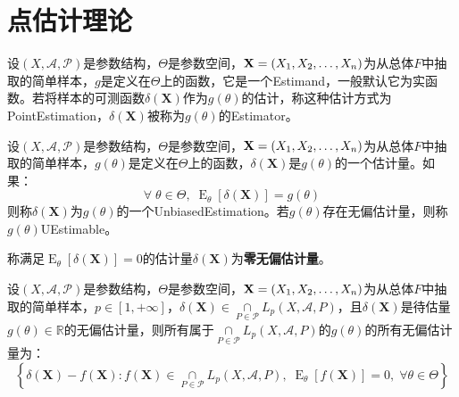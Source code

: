 \chapter{点估计理论}

\begin{definition}
	设$(X,\mathscr{A},\mathscr{P})$是参数结构，$\Theta$是参数空间，$\mathbf{X}=(X_1, X_2, \dots, X_{n})$为从总体$F$中抽取的简单样本，$g$是定义在$\Theta$上的函数，它是一个\gls{Estimand}，一般默认它为实函数。若将样本的可测函数$\delta(\mathbf{X})$作为$g(\theta)$的估计，称这种估计方式为\gls{PointEstimation}，$\delta(\mathbf{X})$被称为$g(\theta)$的\gls{Estimator}。
\end{definition}
\begin{definition}
	设$(X,\mathscr{A},\mathscr{P})$是参数结构，$\Theta$是参数空间，$\mathbf{X}=(X_1, X_2, \dots, X_{n})$为从总体$F$中抽取的简单样本，$g(\theta)$是定义在$\Theta$上的函数，$\delta(\mathbf{X})$是$g(\theta)$的一个估计量。如果：
	\begin{equation*}
		\forall\;\theta\in\Theta,\;\operatorname{E}_{\theta}[\delta(\mathbf{X})]=g(\theta)
	\end{equation*}
	则称$\delta(\mathbf{X})$为$g(\theta)$的一个\gls{UnbiasedEstimation}。若$g(\theta)$存在无偏估计量，则称$g(\theta)$\gls{UEstimable}。
\end{definition}
\begin{definition}
	称满足$\operatorname{E}_{\theta}[\delta(\mathbf{X})]=0$的估计量$\delta(\mathbf{X})$为\textbf{零无偏估计量}。
\end{definition}
\begin{property}\label{prop:UnbiasedEstimator}
	设$(X,\mathscr{A},\mathscr{P})$是参数结构，$\Theta$是参数空间，$\mathbf{X}=(X_1, X_2, \dots, X_{n})$为从总体$F$中抽取的简单样本，$p\in[1,+\infty]$，$\delta(\mathbf{X})\in\underset{P\in\mathscr{P}}{\cap}L_p(X,\mathscr{A},P)$，且$\delta(\mathbf{X})$是待估量$g(\theta)\in\mathbb{R}$的无偏估计量，则所有属于$\underset{P\in\mathscr{P}}{\cap}L_p(X,\mathscr{A},P)$的$g(\theta)$的所有无偏估计量为：
	\begin{equation*}
		\left\{\delta(\mathbf{X})-f(\mathbf{X}):f(\mathbf{X})\in\underset{P\in\mathscr{P}}{\cap}L_p(X,\mathscr{A},P),\;\operatorname{E}_\theta[f(\mathbf{X})]=0,\;\forall\theta\in\Theta\right\}
	\end{equation*}
\end{property}

